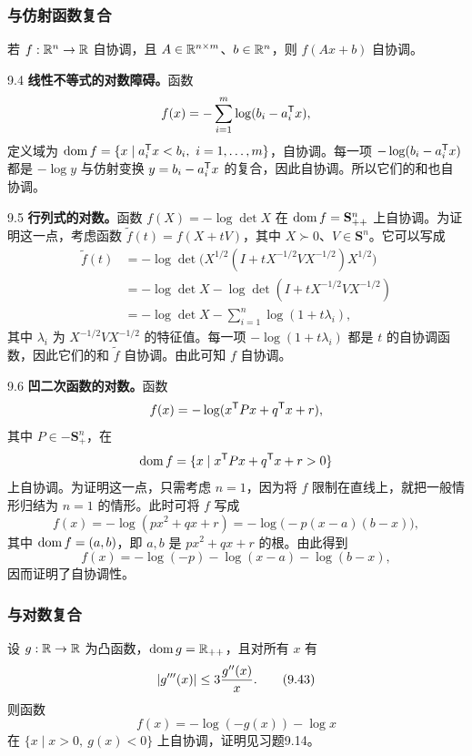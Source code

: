 \subsubsection*{与仿射函数复合}
若 $f:\mathbb R^n\to\mathbb R$ 自协调，且 $A\in\mathbb R^{n\times m}$、$b\in\mathbb R^n$，则 $f(Ax+b)$ 自协调。

\begin{origexample}{9.4}
\textbf{线性不等式的对数障碍。}函数
\[
 f(x)=-\sum_{i=1}^m\log(b_i-a_i^\mathsf T x),
\]
定义域为 $\dom f=\{x\mid a_i^\T x<b_i,\ i=1,\ldots,m\}$，自协调。每一项 $-\log(b_i-a_i^\mathsf T x)$ 都是 $-\log y$ 与仿射变换 $y=b_i-a_i^\mathsf T x$ 的复合，因此自协调。所以它们的和也自协调。
\end{origexample}

\begin{origexample}{9.5}
\textbf{行列式的对数。}函数 $f(X)=-\log\det X$ 在 $\operatorname{dom} f=\mathbf S_{++}^n$ 上自协调。为证明这一点，考虑函数 $\widetilde f(t)=f(X+tV)$，其中 $X\succ0$、$V\in\mathbf S^n$。它可以写成
\[
\begin{aligned}
 \widetilde f(t)&=-\log\det\bigl(X^{1/2}(I+tX^{-1/2}VX^{-1/2})X^{1/2}\bigr)\\
 &=-\log\det X-\log\det(I+tX^{-1/2}VX^{-1/2})\\
 &=-\log\det X-\sum_{i=1}^n\log(1+t\lambda_i),
\end{aligned}
\]
其中 $\lambda_i$ 为 $X^{-1/2}VX^{-1/2}$ 的特征值。每一项 $-\log(1+t\lambda_i)$ 都是 $t$ 的自协调函数，因此它们的和 $\widetilde f$ 自协调。由此可知 $f$ 自协调。
\end{origexample}

\begin{origexample}{9.6}
\textbf{凹二次函数的对数。}函数
\[
 f(x)=-\log(x^\mathsf T Px+q^\mathsf T x+r),
\]
其中 $P\in-\mathbf S_+^n$，在
\[
 \operatorname{dom} f=\{x\mid x^\mathsf T Px+q^\mathsf T x+r>0\}
\]
上自协调。为证明这一点，只需考虑 $n=1$，因为将 $f$ 限制在直线上，就把一般情形归结为 $n=1$ 的情形。此时可将 $f$ 写成
\[
 f(x)=-\log(px^2+qx+r)=-\log\bigl(-p(x-a)(b-x)\bigr),
\]
其中 $\operatorname{dom} f=(a,b)$，即 $a,b$ 是 $px^2+qx+r$ 的根。由此得到
\[
 f(x)=-\log(-p)-\log(x-a)-\log(b-x),
\]
因而证明了自协调性。
\end{origexample}

\subsubsection*{与对数复合}
设 $g:\mathbb R\to\mathbb R$ 为凸函数，$\operatorname{dom} g=\mathbb R_{++}$，且对所有 $x$ 有
\begin{equation}
 \left\lvert g'''(x)\right\rvert\le3\frac{g''(x)}x.\tag{9.43}
\end{equation}
则函数
\[
 f(x)=-\log(-g(x))-\log x
\]
在 $\{x\mid x>0,\ g(x)<0\}$ 上自协调，证明见习题9.14。

